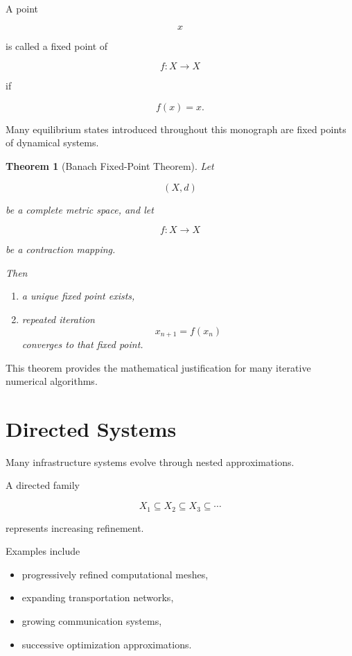 \documentclass[11pt,fleqn]{book}
\numberwithin{equation}{chapter}
\theoremstyle{plain}
\newtheorem{theorem}{Theorem}[chapter]
\theoremstyle{definition}
\theoremstyle{remark}
\begin{document}
A point

\[
x
\]

is called a fixed point of

\[
f:X\rightarrow X
\]

if

\[
f(x)=x.
\]

Many equilibrium states introduced throughout this monograph are fixed
points of dynamical systems.


\begin{theorem}[Banach Fixed-Point Theorem]

Let

\[
(X,d)
\]

be a complete metric space, and let

\[
f:X\rightarrow X
\]

be a contraction mapping.

Then

\begin{enumerate}
\item a unique fixed point exists,
\item repeated iteration
\[
x_{n+1}=f(x_n)
\]
converges to that fixed point.
\end{enumerate}

\end{theorem}

This theorem provides the mathematical justification for many iterative
numerical algorithms.


\section{Directed Systems}

Many infrastructure systems evolve through nested approximations.

A directed family

\[
X_1
\subseteq
X_2
\subseteq
X_3
\subseteq
\cdots
\]

represents increasing refinement.

Examples include

\begin{itemize}
\item progressively refined computational meshes,
\item expanding transportation networks,
\item growing communication systems,
\item successive optimization approximations.
\end{itemize}
\end{document}
